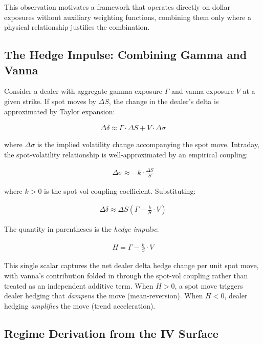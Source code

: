 \documentclass[11pt, a4paper]{article}
\begin{document}
This observation motivates a framework that operates directly on dollar exposures without auxiliary weighting functions, combining them only where a physical relationship justifies the combination.

\subsection{The Hedge Impulse: Combining Gamma and Vanna}

Consider a dealer with aggregate gamma exposure $\Gamma$ and vanna exposure $V$ at a given strike. If spot moves by $\Delta S$, the change in the dealer's delta is approximated by Taylor expansion:

\begin{align}
\Delta\delta \approx \Gamma \cdot \Delta S + V \cdot \Delta\sigma
\end{align}

where $\Delta\sigma$ is the implied volatility change accompanying the spot move. Intraday, the spot-volatility relationship is well-approximated by an empirical coupling:

\begin{align}
\Delta\sigma \approx -k \cdot \frac{\Delta S}{S}
\label{eq:spot-vol-coupling}
\end{align}

where $k > 0$ is the spot-vol coupling coefficient. Substituting:

\begin{align}
\Delta\delta \approx \Delta S \left(\Gamma - \frac{k}{S} \cdot V\right)
\end{align}

The quantity in parentheses is the \emph{hedge impulse}:

\begin{align}
\boxed{H = \Gamma - \frac{k}{S} \cdot V}
\label{eq:hedge-impulse}
\end{align}

This single scalar captures the net dealer delta hedge change per unit spot move, with vanna's contribution folded in through the spot-vol coupling rather than treated as an independent additive term. When $H > 0$, a spot move triggers dealer hedging that \emph{dampens} the move (mean-reversion). When $H < 0$, dealer hedging \emph{amplifies} the move (trend acceleration).

\subsection{Regime Derivation from the IV Surface}
\label{subsec:regime-derivation}
\end{document}
